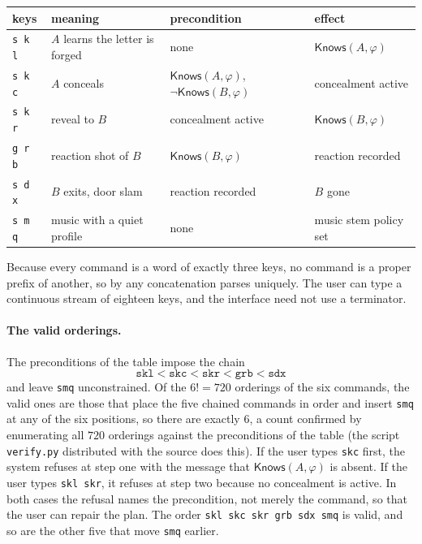 \begin{center}
\small
\begin{tabular}{p{1.0cm}p{3.3cm}p{3.7cm}p{3.1cm}}
\toprule
keys & meaning & precondition & effect\\
\midrule
\texttt{s k l} & $A$ learns the letter is forged & none & $\mathsf{Knows}(A,\varphi)$\\
\texttt{s k c} & $A$ conceals & $\mathsf{Knows}(A,\varphi)$, $\neg\mathsf{Knows}(B,\varphi)$ & concealment active\\
\texttt{s k r} & reveal to $B$ & concealment active & $\mathsf{Knows}(B,\varphi)$\\
\texttt{g r b} & reaction shot of $B$ & $\mathsf{Knows}(B,\varphi)$ & reaction recorded\\
\texttt{s d x} & $B$ exits, door slam & reaction recorded & $B$ gone\\
\texttt{s m q} & music with a quiet profile & none & music stem policy set\\
\bottomrule
\end{tabular}
\end{center}

Because every command is a word of exactly three keys, no command is a proper prefix of another, so by  any concatenation parses uniquely. The user can type a continuous stream of eighteen keys, and the interface need not use a terminator.

\paragraph{The valid orderings.} The preconditions of the table impose the chain
\[
\texttt{skl}<\texttt{skc}<\texttt{skr}<\texttt{grb}<\texttt{sdx}
\]
and leave \texttt{smq} unconstrained. Of the $6!=720$ orderings of the six commands, the valid ones are those that place the five chained commands in order and insert \texttt{smq} at any of the six positions, so there are exactly $6$, a count confirmed by enumerating all $720$ orderings against the preconditions of the table (the script \texttt{verify.py} distributed with the source does this). If the user types \texttt{skc} first, the system refuses at step one with the message that $\mathsf{Knows}(A,\varphi)$ is absent. If the user types \texttt{skl skr}, it refuses at step two because no concealment is active. In both cases the refusal names the precondition, not merely the command, so that the user can repair the plan. The order \texttt{skl skc skr grb sdx smq} is valid, and so are the other five that move \texttt{smq} earlier.

